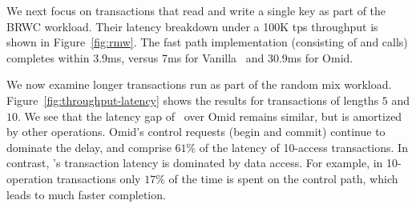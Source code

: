 We next focus on transactions that read and write a single key as part of the BRWC workload. 
Their latency breakdown under a 100K tps throughput is shown in Figure~\ref{fig:rmw}.
The fast path implementation (consisting of  and  calls) completes within 3.9ms,
versus 7ms for Vanilla \sys\ and 30.9ms for Omid. 

We now examine longer transactions run as part of the random mix workload.
Figure~\ref{fig:throughput-latency} shows the results for transactions of lengths $5$ and $10$.
We see that the latency gap of \sys\ over Omid remains similar, but is amortized 
by other operations. Omid's control requests (begin and commit) continue to 
dominate the delay, and comprise $61\%$ of the latency of 10-access transactions.
In contrast, \sys's transaction latency is dominated by data access. For example, in 10-operation transactions only 
$17\%$ of the time is spent on the control path, which leads to much faster completion. 

